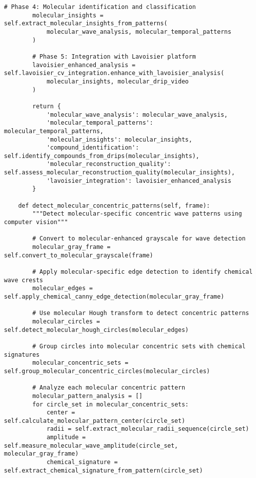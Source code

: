 \documentclass[12pt,a4paper]{article}
\begin{document}
\begin{lstlisting}[style=pythonstyle, caption=Computer Vision Molecular Pattern Analysis]
        # Phase 4: Molecular identification and classification
        molecular_insights = self.extract_molecular_insights_from_patterns(
            molecular_wave_analysis, molecular_temporal_patterns
        )
        
        # Phase 5: Integration with Lavoisier platform
        lavoisier_enhanced_analysis = self.lavoisier_cv_integration.enhance_with_lavoisier_analysis(
            molecular_insights, molecular_drip_video
        )
        
        return {
            'molecular_wave_analysis': molecular_wave_analysis,
            'molecular_temporal_patterns': molecular_temporal_patterns,
            'molecular_insights': molecular_insights,
            'compound_identification': self.identify_compounds_from_drips(molecular_insights),
            'molecular_reconstruction_quality': self.assess_molecular_reconstruction_quality(molecular_insights),
            'lavoisier_integration': lavoisier_enhanced_analysis
        }
    
    def detect_molecular_concentric_patterns(self, frame):
        """Detect molecular-specific concentric wave patterns using computer vision"""
        
        # Convert to molecular-enhanced grayscale for wave detection
        molecular_gray_frame = self.convert_to_molecular_grayscale(frame)
        
        # Apply molecular-specific edge detection to identify chemical wave crests
        molecular_edges = self.apply_chemical_canny_edge_detection(molecular_gray_frame)
        
        # Use molecular Hough transform to detect concentric patterns
        molecular_circles = self.detect_molecular_hough_circles(molecular_edges)
        
        # Group circles into molecular concentric sets with chemical signatures
        molecular_concentric_sets = self.group_molecular_concentric_circles(molecular_circles)
        
        # Analyze each molecular concentric pattern
        molecular_pattern_analysis = []
        for circle_set in molecular_concentric_sets:
            center = self.calculate_molecular_pattern_center(circle_set)
            radii = self.extract_molecular_radii_sequence(circle_set)
            amplitude = self.measure_molecular_wave_amplitude(circle_set, molecular_gray_frame)
            chemical_signature = self.extract_chemical_signature_from_pattern(circle_set)
            

\end{lstlisting}
\end{document}
